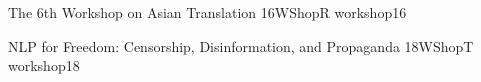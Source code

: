 \begin{wsschedule}
 {The 6th Workshop on Asian Translation}
 {16}{WShopR}
 {workshop16}
 {\WShopLocR}
 
\end{wsschedule}


\begin{wsschedule}
 {NLP for Freedom: Censorship, Disinformation, and Propaganda}
 {18}{WShopT}
 {workshop18}
 {\WShopLocT}
 
\end{wsschedule}
 
\clearpage{\thispagestyle{emptyheader}\cleardoublepage}
